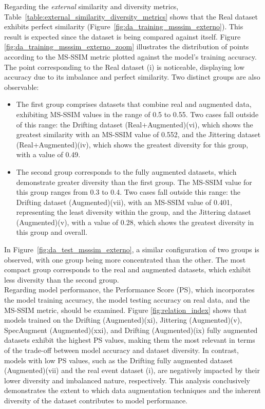 \documentclass[lettersize,journal]{IEEEtran}
\begin{document}
Regarding the \textit{external} similarity and diversity metrics, Table~\ref{table:external_similarity_diversity_metrics} shows that the Real dataset exhibits perfect similarity (Figure~\ref{fig:da_training_msssim_externo}). This result is expected since the dataset is being compared against itself.
Figure \ref{fig:da_training_msssim_externo_zoom} illustrates the distribution of points according to the MS-SSIM metric plotted against the model's training accuracy. The point corresponding to the Real dataset (i) is noticeable, displaying low accuracy due to its imbalance and perfect similarity. Two distinct groups are also observable:
\begin{itemize}
\item The first group comprises datasets that combine real and augmented data, exhibiting MS-SSIM values in the range of 0.5 to 0.55. Two cases fall outside of this range: the Drifting dataset (Real+Augmented)(vi), which shows the greatest similarity with an MS-SSIM value of 0.552, and the Jittering dataset (Real+Augmented)(iv), which shows the greatest diversity for this group, with a value of 0.49.
\item The second group corresponds to the fully augmented datasets, which demonstrate greater diversity than the first group. The MS-SSIM value for this group ranges from 0.3 to 0.4. Two cases fall outside this range: the Drifting dataset (Augmented)(vii), with an MS-SSIM value of 0.401, representing the least diversity within the group, and the Jittering dataset (Augmented)(v), with a value of 0.28, which shows the greatest diversity in this group and overall.
\end{itemize}
In Figure~\ref{fig:da_test_msssim_externo}, a similar configuration of two groups is observed, with one group being more concentrated than the other. The most compact group corresponds to the real and augmented datasets, which exhibit less diversity than the second group.\\

Regarding model performance, the Performance Score (PS), which incorporates the model training accuracy, the model testing accuracy on real data, and the MS-SSIM metric, should be examined. Figure \ref{fig:relation_index} shows that models trained on the Drifting (Augmented)(xi), Jittering (Augmented)(v), SpecAugment (Augmented)(xxi), and Drifting (Augmented)(ix) fully augmented datasets exhibit the highest PS values, making them the most relevant in terms of the trade-off between model accuracy and dataset diversity. In contrast, models with low PS values, such as the Drifting fully augmented dataset (Augmented)(vii) and the real event dataset (i), are negatively impacted by their lower diversity and imbalanced nature, respectively. This analysis conclusively demonstrates the extent to which data augmentation techniques and the inherent diversity of the dataset contributes to model performance.
\end{document}
